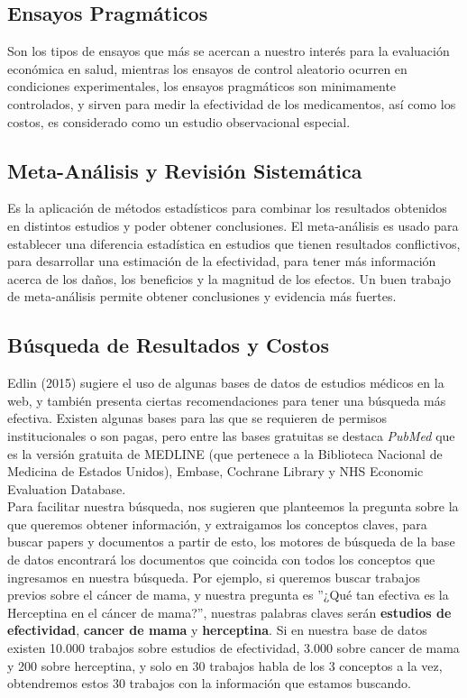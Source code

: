 \documentclass[12pt]{article}
\begin{document}
\subsection{Ensayos Pragmáticos}

Son los tipos de ensayos que más se acercan a nuestro interés para la evaluación económica en salud, mientras los ensayos de control aleatorio ocurren en condiciones experimentales, los ensayos pragmáticos son minimamente controlados, y sirven para medir la efectividad de los medicamentos, así como los costos, es considerado como un estudio observacional especial.

\subsection{Meta-Análisis y Revisión Sistemática}

Es la aplicación de métodos estadísticos para combinar los resultados obtenidos en distintos estudios y poder obtener conclusiones.
El meta-análisis es usado para establecer una diferencia estadística en estudios que tienen resultados conflictivos, para desarrollar una estimación de la efectividad, para tener más información acerca de los daños, los beneficios y la magnitud de los efectos. Un buen trabajo de meta-análisis permite obtener conclusiones y evidencia más fuertes.

\subsection{Búsqueda de Resultados y Costos}

\cite{edlin_cost_2015} Edlin (2015) sugiere el uso de algunas bases de datos de estudios médicos en la web, y también presenta ciertas recomendaciones para tener una búsqueda más efectiva. Existen algunas bases para las que se requieren de permisos institucionales o son pagas, pero entre las bases gratuitas se destaca \textit{PubMed} que es la versión gratuita de MEDLINE (que pertenece a la Biblioteca Nacional de Medicina de Estados Unidos), Embase, Cochrane Library y NHS Economic Evaluation Database.\\

Para facilitar nuestra búsqueda, nos sugieren que planteemos la pregunta sobre la que queremos obtener información, y extraigamos los conceptos claves, para buscar papers y documentos a partir de esto, los motores de búsqueda de la base de datos encontrará los documentos que coincida con todos los conceptos que ingresamos en nuestra búsqueda. Por ejemplo, si queremos buscar trabajos previos sobre el cáncer de mama, y nuestra pregunta es ''¿Qué tan efectiva es la Herceptina en el cáncer de mama?'', nuestras palabras claves serán \textbf{estudios de efectividad}, \textbf{cancer de mama} y \textbf{herceptina}. Si en nuestra base de datos existen 10.000 trabajos sobre estudios de efectividad, 3.000 sobre cancer de mama y 200 sobre herceptina, y solo en 30 trabajos habla de los 3 conceptos a la vez, obtendremos estos 30 trabajos con la información que estamos buscando.\\
\end{document}
